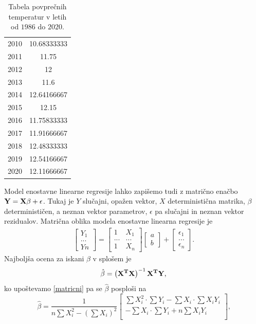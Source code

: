 \documentclass{article}
\begin{document}
\begin{table}[H]
\begin{tabular}{c c}
        2010  & 	10.68333333     \\
        2011  & 	11.75       \\
        2012  & 	12      \\
        2013  & 	11.6        \\
        2014  & 	12.64166667     \\
        2015  & 	12.15       \\
        2016  & 	11.75833333     \\
        2017  & 	11.91666667     \\
        2018  & 	12.48333333     \\
        2019  & 	12.54166667     \\
        2020  & 	12.11666667     \\
    \end{tabular}
    \caption{Tabela povprečnih temperatur v letih od $1986$ do $2020$.}
\end{table}
Model enostavne linearne regresije lahko zapišemo tudi z matrično enačbo $\bf{Y} = \bf{X} \beta + \epsilon$.
Tukaj je $Y$ slučajni, opažen vektor, $X$ deterministična matrika, $\beta$ determinističen, a neznan
vektor parametrov, $\epsilon$ pa slučajni in neznan vektor rezidualov. Matrična oblika modela enostavne 
linearna regresije je
\begin{gather}
    \label{matricni}
    \begin{bmatrix}
        Y_1 \\ ... \\ Yn
    \end{bmatrix}
    =
    \begin{bmatrix}
        1 & X_1 \\ ... & ... \\ 1 & X_n
    \end{bmatrix}
    \begin{bmatrix}
        a \\ b
    \end{bmatrix}
    +
    \begin{bmatrix}
        \epsilon_1 \\ ... \\ \epsilon_n
    \end{bmatrix} \text{.}
\end{gather}
Najboljša ocena za iskani $\beta$ v splošem je
$$ \hat{\beta} = \left( \bf{X}^T \bf{X} \right)^{-1} \bf{X}^T \bf{Y} \text{,} $$
ko upoštevamo \ref{matricni} pa se $\hat{\beta}$ posploši na
\begin{equation}
    \label{beta}
    \hat{\beta} = \frac{1}{n \sum X^2_i - \left( \sum X_i \right)^2 } 
    \begin{bmatrix}
        \sum X_i^2 \cdot \sum Y_i - \sum X_i \cdot \sum X_i Y_i  \\
        - \sum X_i \cdot \sum Y_i + n \sum X_i Y_i  \\
    \end{bmatrix} \text{,}
\end{equation}
\end{document}
